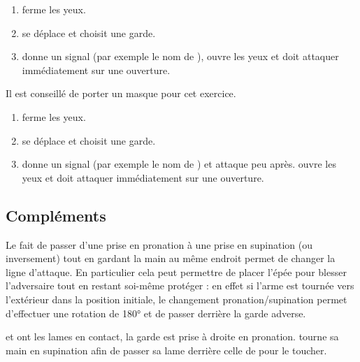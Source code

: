 \begin{exercice}

\begin{enumerate}
	\item \A ferme les yeux.
	
	\item \D se déplace et choisit une garde.
	
	\item \D donne un signal (par exemple le nom de \A), \A ouvre les yeux et doit attaquer immédiatement sur une ouverture.
\end{enumerate}

Il est conseillé de porter un masque pour cet exercice.
\end{exercice}


\begin{exercice}

\begin{enumerate}
	\item \A ferme les yeux.
	
	\item \D se déplace et choisit une garde.
	
	\item \D donne un signal (par exemple le nom de \A) et attaque peu après.
	\A ouvre les yeux et doit attaquer immédiatement sur une ouverture.
\end{enumerate}

\end{exercice}



\subsection{Compléments}


Le fait de passer d'une prise en pronation à une prise en supination (ou inversement) tout en gardant la main au même endroit permet de changer la ligne d'attaque.
En particulier cela peut permettre de placer l'épée pour blesser l'adversaire tout en restant soi-même protéger : en effet si l'arme est tournée vers l'extérieur dans la position initiale, le changement pronation/supination permet d'effectuer une rotation de \ang{180} et de passer derrière la garde adverse.


\begin{technique}
\label{struct:tech:changement-ligne}

\A et \D ont les lames en contact, la garde est prise à droite en pronation.
\A tourne sa main en supination afin de passer sa lame derrière celle de \D pour le toucher.

\end{technique}


